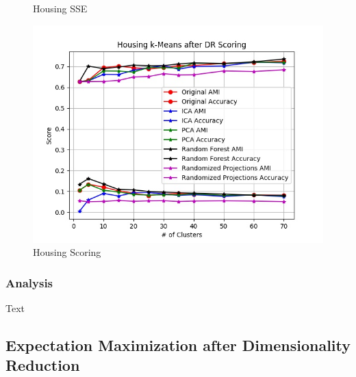 \documentclass[h]{article}
\begin{document}
\begin{figure}[H]
      \caption*{Housing SSE} 
   \endminipage\hfill
      \includegraphics[width=1\textwidth,keepaspectratio]{housing_k-means_after_dr_scoring.jpg} 
      \caption*{Housing Scoring} 
   \endminipage\hfill
  \end{figure}
  
\subsubsection*{Analysis}
Text

\subsection*{Expectation Maximization after Dimensionality Reduction}
\end{document}
